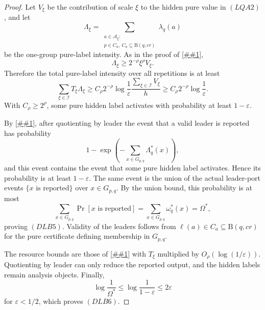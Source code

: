 \documentclass[10pt]{article}
\newcommand{\cref}[1]{\ref{##1}}
\theoremstyle{definition}
\newcommand{\Ball}{\mathrm{B}}
\begin{document}
\begin{proof}
   Let \(V_\xi\) be the contribution of scale \(\xi\) to the hidden pure value
   in \((LQA2)\), and let
   \[
      \Lambda_\xi=
      \sum_{\substack{a\in\mathcal A_\xi:\\
                      p\in C_a,\ C_a\subseteq\Ball(q,cr)}}
      \lambda_q(a)
   \]
   be the one-group pure-label intensity.  As in the proof of
   \cref{lem:dyadic-leader-quotient},
   \[
      \Lambda_\xi\ge2^{-\rho}\xi^\rho V_\xi .
      \tag{DLB7}
   \]
   Therefore the total pure-label intensity over all repetitions is at least
   \[
      \sum_{\xi\in\mathcal I}T_\xi\Lambda_\xi
      \ge
      C_\rho2^{-\rho}\log\frac1\varepsilon
      \frac{\sum_{\xi\in\mathcal I}V_\xi}{h}
      \ge
      C_\rho2^{-\rho}\log\frac1\varepsilon .
   \]
   With \(C_\rho\ge2^\rho\), some pure hidden label activates with probability
   at least \(1-\varepsilon\).

   By \cref{lem:poisson-leader-superposition}, after quotienting by leader the
   event that a valid leader is reported has probability
   \[
      1-\exp\!\left(-\sum_{x\in G_{p,q}}\Lambda^*_q(x)\right),
   \]
   and this event contains the event that some pure hidden label activates.
   Hence its probability is at least \(1-\varepsilon\).  The same event is the
   union of the actual leader-port events \(\{x\text{ is reported}\}\) over
   \(x\in G_{p,q}\).  By the union bound, this probability is at most
   \[
      \sum_{x\in G_{p,q}}\Pr[x\text{ is reported}]
      =
      \sum_{x\in G_{p,q}}\omega^*_q(x)
      =
      \Omega^*,
   \]
   proving \((DLB5)\).  Validity of the leaders follows from
   \(\ell(a)\in C_a\subseteq\Ball(q,cr)\) for the pure certificate defining
   membership in \(G_{p,q}\).

   The resource bounds are those of \cref{lem:dyadic-leader-quotient} with
   \(T_\xi\) multiplied by \(O_\rho(\log(1/\varepsilon))\).  Quotienting by
   leader can only reduce the reported output, and the hidden labels remain
   analysis objects.  Finally,
   \[
      \log\frac1{\Omega^*}
      \le
      \log\frac1{1-\varepsilon}
      \le2\varepsilon
   \]
   for \(\varepsilon<1/2\), which proves \((DLB6)\).
\end{proof}
\end{document}
